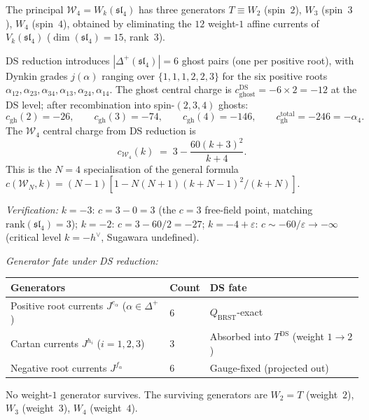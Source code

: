 \begin{computation}
\label{comp:w4-ds-data}
%
The principal $\mathcal{W}_4 = W_k(\mathfrak{sl}_4)$ has three
generators $T \equiv W_2$ (spin~$2$), $W_3$ (spin~$3$),
$W_4$ (spin~$4$), obtained by eliminating the $12$ weight-$1$
affine currents of $V_k(\mathfrak{sl}_4)$
($\dim(\mathfrak{sl}_4) = 15$, rank~$3$).

DS reduction introduces $|\Delta^+(\mathfrak{sl}_4)| = 6$ ghost
pairs (one per positive root), with Dynkin grades $j(\alpha)$
ranging over $\{1, 1, 1, 2, 2, 3\}$ for the six positive roots
$\alpha_{12}, \alpha_{23}, \alpha_{34}, \alpha_{13}, \alpha_{24},
\alpha_{14}$. The ghost central charge is
$c_{\mathrm{ghost}}^{\mathrm{DS}} = -6 \times 2 = -12$ at the
DS level; after recombination into spin-$(2,3,4)$ ghosts:
\[
c_{\mathrm{gh}}(2) = -26,
\qquad c_{\mathrm{gh}}(3) = -74,
\qquad c_{\mathrm{gh}}(4) = -146,
\qquad c_{\mathrm{gh}}^{\mathrm{total}} = -246 = -\alpha_4.
\]
The $\mathcal{W}_4$ central charge from DS reduction is
\begin{equation}
\label{eq:w4-central-charge}
c_{\mathcal{W}_4}(k)
\;=\; 3 - \frac{60(k+3)^2}{k+4}.
\end{equation}
This is the $N = 4$ specialisation of the general formula
$c(\mathcal{W}_N, k) = (N-1)[1 - N(N+1)(k+N-1)^2/(k+N)]$.

\emph{Verification:}
$k = -3$: $c = 3 - 0 = 3$ (the $c = 3$ free-field point,
matching $\mathrm{rank}(\mathfrak{sl}_4) = 3$);
$k = -2$: $c = 3 - 60/2 = -27$;
$k = -4 + \varepsilon$: $c \sim -60/\varepsilon \to -\infty$
(critical level $k = -h^\vee$, Sugawara undefined).

\emph{Generator fate under DS reduction:}
\begin{center}
\small
\renewcommand{\arraystretch}{1.3}
\begin{tabular}{lll}
\toprule
\textbf{Generators} & \textbf{Count} & \textbf{DS fate} \\
\midrule
Positive root currents
 $J^{e_\alpha}$ ($\alpha \in \Delta^+$) & $6$ &
 $Q_{\mathrm{BRST}}$-exact \\
Cartan currents $J^{h_i}$ ($i = 1,2,3$) & $3$ &
 Absorbed into $T^{\mathrm{DS}}$ (weight $1 \to 2$) \\
Negative root currents $J^{f_\alpha}$ & $6$ &
 Gauge-fixed (projected out) \\
\bottomrule
\end{tabular}
\end{center}
No weight-$1$ generator survives. The surviving generators are
$W_2 = T$ (weight~$2$), $W_3$ (weight~$3$), $W_4$ (weight~$4$).
\end{computation}

